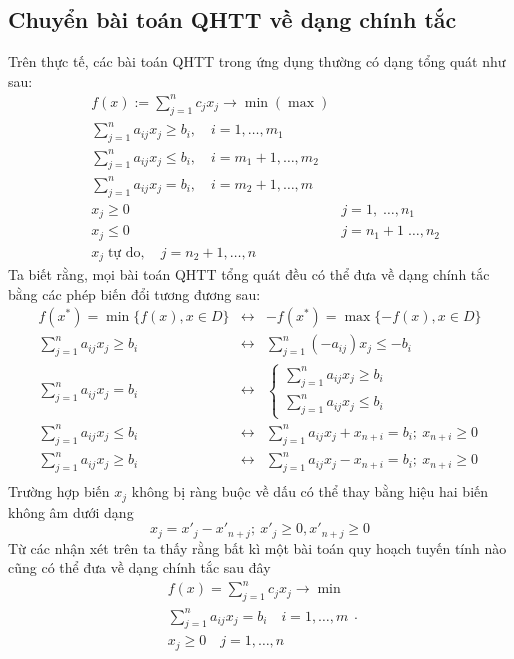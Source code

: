\subsection{Chuyển bài toán QHTT về dạng chính tắc}
Trên thực tế, các bài toán QHTT trong ứng dụng thường có dạng tổng quát như sau:
\begin{align*}
&f(x):=\sum_{j=1}^nc_jx_j\rightarrow \min(\max)\\
&\sum_{j=1}^na_{ij}x_j\geq b_i,\quad i=1,\dots,m_1\\
&\sum_{j=1}^na_{ij}x_j\leq b_i,\quad i=m_1+1,\dots,m_2\\
&\sum_{j=1}^na_{ij}x_j= b_i,\quad i=m_2+1,\dots,m\\
&x_j\geq0&j=1,\;\dots,n_1\\
&x_j\leq0&j=n_1+1\; \dots,n_2\\
&x_j \; \textrm{tự do},\quad j=n_2+1,\dots,n
\end{align*}
Ta biết rằng, mọi bài toán QHTT tổng quát đều có thể đưa về dạng chính tắc bằng các phép biến đổi tương đương sau:
\begin{displaymath}
\begin{array}{llll}
f(x^\ast)= \min\{f(x),x\in D\}&\leftrightarrow&-f(x^\ast) = \max\{-f(x),x\in D\}\\
\sum_{j=1}^na_{ij}x_j\geq b_i&\leftrightarrow&\sum_{j=1}^n(-a_{ij})x_j\leq -b_i\\
\sum_{j=1}^na_{ij}x_j=b_i&\leftrightarrow&\left\{\begin{array}{ll}\sum_{j=1}^na_{ij}x_j\geq b_i\\\sum_{j=1}^na_{ij}x_j\leq b_i\end{array}\right.\\
\sum_{j=1}^na_{ij}x_j\leq b_i&\leftrightarrow&\sum_{j=1}^na_{ij}x_j+x_{n+i}=b_i;~x_{n+i}\geq 0\\
\sum_{j=1}^na_{ij}x_j\geq b_i&\leftrightarrow&\sum_{j=1}^na_{ij}x_j-x_{n+i}=b_i;~x_{n+i}\geq 0\\
\end{array}
\end{displaymath}
Trường hợp biến $x_j$ không bị ràng buộc về dấu có thể thay bằng hiệu hai biến không âm dưới dạng
\begin{displaymath}
x_j=x'_j-x'_{n+j};~ x'_j\geq0,x'_{n+j}\geq 0
\end{displaymath}
Từ các nhận xét trên ta thấy rằng bất kì một bài toán quy hoạch tuyến tính nào cũng có thể đưa về dạng chính tắc sau đây
\begin{equation}\label{10001}
\begin{array}{lll}
f(x)=\sum_{j=1}^nc_jx_j\rightarrow \min\\
\sum_{j=1}^na_{ij}x_j=b_i\quad i=1,\dots,m\\
x_j\geq0 \quad j=1,\dots,n
\end{array}.
\end{equation}

